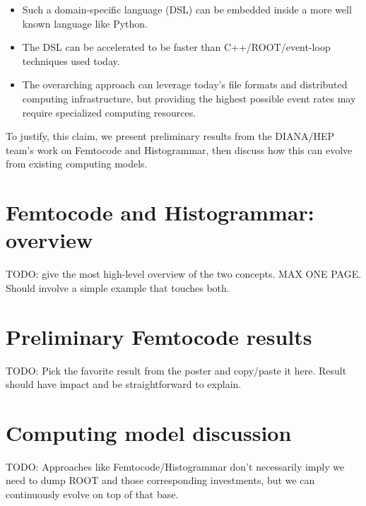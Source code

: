 \documentclass{article}
\begin{document}
\begin{itemize}
\item Such a domain-specific language (DSL) can be embedded inside a more well known language like Python.
\item The DSL can be accelerated to be faster than C++/ROOT/event-loop techniques used today.
\item The overarching approach can leverage today's file formats and distributed computing infrastructure, but providing the highest possible event rates may require specialized computing resources.
\end{itemize}

To justify, this claim, we present preliminary results from the DIANA/HEP team's work on Femtocode and Histogrammar, then discuss how this can evolve from existing computing models.

\section{Femtocode and Histogrammar: overview}

TODO: give the most high-level overview of the two concepts. MAX ONE PAGE. Should involve a simple example that touches both.

\section{Preliminary Femtocode results}

TODO: Pick the favorite result from the poster and copy/paste it here. Result should have impact and be straightforward to explain.

\section{Computing model discussion}

TODO: Approaches like Femtocode/Histogrammar don't necessarily imply we need to dump ROOT and those corresponding investments, but we can continuously evolve on top of that base.
\end{document}
